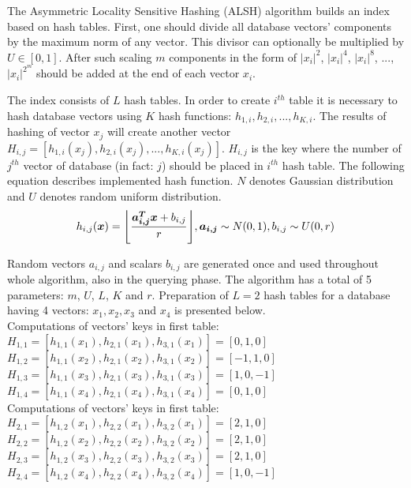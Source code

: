 The Asymmetric Locality Sensitive Hashing (ALSH) \cite{alsh} algorithm builds an index based on hash tables.
First, one should divide all database vectors' components by the maximum norm of any vector.
This divisor can optionally be multiplied by $U \in [0,1]$.
After such scaling $m$ components in the form of $|x_i|^2$, $|x_i|^4$, $|x_i|^8$, $ ...$, $|x_i|^{2^m}$ should be added at the end of each vector $x_i$.
\par
The index consists of $L$ hash tables.
In order to create $i^{th}$ table it is necessary to hash database vectors using $K$ hash functions: $h_{1,i}, h_{2,i}, ..., h_{K,i}$.
The results of hashing of vector $x_j$ will create another vector $H_{i,j} = [h_{1,i}(x_j), h_{2,i}(x_j), ..., h_{K,i}(x_j)]$. $H_{i,j}$ is the key where the number of $j^{th}$ vector of database (in fact: $j$) should be placed in $i^{th}$ hash table.
The following equation describes implemented hash function.
$N$ denotes Gaussian distribution and $U$ denotes random uniform distribution.
\begin{equation*}
h_{i,j}(\bm{x}) = \floor*{\frac{\bm{a_{i,j}^T x} + b_{i,j}}{r}}, \bm{a_{i,j}} \sim N(0,1), b_{i,j} \sim U(0,r)
\end{equation*}
\par
Random vectors $a_{i,j}$ and scalars $b_{i,j}$ are generated once and used throughout whole algorithm, also in the querying phase. The algorithm has a total of 5 parameters: $m$, $U$, $L$, $K$ and $r$.
Preparation of $L = 2$ hash tables for a database having 4 vectors: $x_1, x_2, x_3$ and $x_4$ is presented below.
\\
Computations of vectors' keys in first table:\\
$H_{1,1} = [h_{1,1}(x_1), h_{2,1}(x_1), h_{3,1}(x_1)] = [0, 1, 0]$\\
$H_{1,2} = [h_{1,1}(x_2), h_{2,1}(x_2), h_{3,1}(x_2)] = [-1, 1, 0]$\\
$H_{1,3} = [h_{1,1}(x_3), h_{2,1}(x_3), h_{3,1}(x_3)] = [1, 0, -1]$\\
$H_{1,4} = [h_{1,1}(x_4), h_{2,1}(x_4), h_{3,1}(x_4)] = [0, 1, 0]$\\
Computations of vectors' keys in first table:\\
$H_{2,1} = [h_{1,2}(x_1), h_{2,2}(x_1), h_{3,2}(x_1)] = [2, 1, 0]$\\
$H_{2,2} = [h_{1,2}(x_2), h_{2,2}(x_2), h_{3,2}(x_2)] = [2, 1, 0]$\\
$H_{2,3} = [h_{1,2}(x_3), h_{2,2}(x_3), h_{3,2}(x_3)] = [2, 1, 0]$\\
$H_{2,4} = [h_{1,2}(x_4), h_{2,2}(x_4), h_{3,2}(x_4)] = [1, 0, -1]$\\
